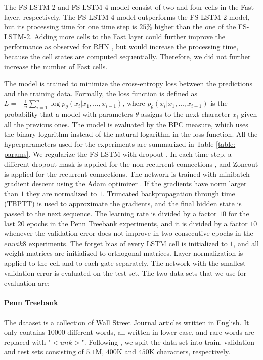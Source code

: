 \documentclass{article}
\begin{document}
The FS-LSTM-2 and FS-LSTM-4 model consist of two and four cells in the Fast layer, respectively.  The FS-LSTM-4 model outperforms the FS-LSTM-2 model, but its processing time for one time step is $25\%$ higher than the one of the FS-LSTM-2. Adding more cells to the Fast layer could further improve the performance as observed for RHN \cite{zilly2016recurrent}, but would increase the processing time, because  the cell states are computed sequentially. Therefore, we did not further increase the number of Fast cells. 





The model is trained to minimize the cross-entropy loss between the predictions and the training data. Formally, the loss function is defined as $L=-\frac{1}{n}  \sum^n_{i=1}{\log p_{\theta}(x_i | x_{1},\ldots, x_{i-1})}$, where $p_{\theta}(x_i | x_{1},\ldots, x_{i-1})$ is the probability that a model with parameters $\theta$ assigns to the next character $x_i$ given all the previous ones. The model is evaluated by the BPC measure, which uses the binary logarithm instead of the natural logarithm in the loss function.  All the hyperparameters used for the experiments are summarized in Table \ref{table: params}. We regularize the FS-LSTM with dropout \cite{srivastava2014dropout}.  In each time step,  a different dropout mask is applied for the non-recurrent connections \cite{zaremba14rnndropout}, and  Zoneout \cite{krueger16zoneout} is applied for the recurrent connections. The network is trained with minibatch gradient descent  using the Adam optimizer \cite{kingma14adam}. If the gradients have norm larger than $1$ they are normalized to $1$. Truncated backpropagation through time (TBPTT) \cite{rumelhart1988learning, elman90entropy} is used to approximate the gradients, and the final hidden state is passed to the next sequence. The learning rate is divided by a factor  $10$ for the last $20$ epochs in the Penn Treebank experiments, and it is divided by a factor $10$ whenever the validation error does not improve in two consecutive epochs in the $enwik8$ experiments. The forget bias of every LSTM cell  is initialized to $1$, and all weight matrices are initialized to orthogonal matrices. Layer normalization \cite{ba16layernorm} is applied to the cell and to each gate separately. The network with the smallest validation error is evaluated on the test set. The two data sets that we use for evaluation are:


\paragraph{Penn Treebank \cite{marcus1993ptb}} The dataset is a collection of Wall Street Journal articles written in English. It only contains $10000$ different words, all written in lower-case, and rare words are replaced with "$<unk>$". Following \cite{mikolov2012ptb_division}, we split the data set into train, validation and test sets consisting of $5.1$M, $400$K and $450$K characters, respectively.
\end{document}
